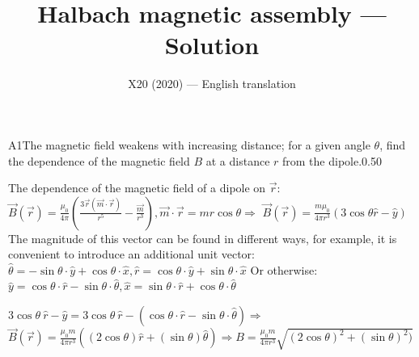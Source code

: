 \documentclass[11pt,a4paper]{article}
\title{\textbf{Halbach magnetic assembly --- Solution}}
\author{\normalsize X20 (2020) — English translation}
\date{}
\begin{document}
\maketitle\vspace{-0.5em}
\begin{solcard}{A1}{The magnetic field weakens with increasing distance; for a given angle $\theta$, find the dependence of the magnetic field $B$ at a distance $r$ from the dipole.}{0.50}

The dependence of the magnetic field of a dipole on $\vec r$: $\vec B (\vec r) = \frac {\mu_0}{4\pi} (\frac{3\vec r (\vec m \cdot \vec r )} {r^5} - \frac { \vec m} {r^3}), \vec m \cdot \vec r = mr \cos \theta \Rightarrow$ $\vec B (\vec r) = \frac {m \mu_0}{4\pi r^3}(3\cos \theta \hat{r} - \hat{y}) $ The magnitude of this vector can be found in different ways, for example, it is convenient to introduce an additional unit vector: $\hat{\theta} = - \sin \theta \cdot \hat{y} + \cos \theta \cdot \hat{x}, \hat{r}=\cos \theta \cdot \hat{y} +\sin \theta \cdot \hat{x}$ Or otherwise: $\hat{y}=\cos\theta\cdot \hat{r} - \sin \theta \cdot \hat{\theta}, \hat{x}= \sin \theta \cdot \hat{r} + \cos \theta \cdot \hat{\theta}$


$3 \cos \theta~\hat{r} - \hat{y} = 3 \cos \theta~\hat{r} - (\cos \theta \cdot \hat{r} - \sin \theta \cdot \hat{\theta}) \Rightarrow$ $\vec B (\vec r) = \frac {\mu_0 m} {4 \pi r^3} ((2 \cos \theta) \hat{r} + (\sin \theta) \hat{\theta}) \Rightarrow B = \frac {\mu_0 m}{4\pi r^3} \sqrt{(2\cos \theta)^2+(\sin \theta)^2)} $

\end{solcard}
\end{document}
